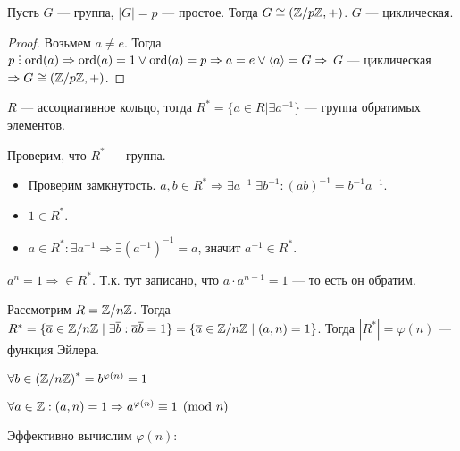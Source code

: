 \begin{remark}
    Пусть $G$ --- группа,  $|G| = p$ --- простое. Тогда  $G \cong (\mathbb{Z} / p\mathbb{Z}, +)$.  $G$ --- циклическая.
\end{remark}
\begin{proof}
    Возьмем $a \neq e$. Тогда  $p \divby \ord(a) \Rightarrow \ord(a) = 1 \lor \ord(a) = p \Rightarrow a = e \lor \langle a \rangle = G \Rightarrow$
    $G$ --- циклическая  $\Rightarrow G \cong (\mathbb{Z} / p \mathbb{Z}, +)$. 
\end{proof}
\begin{definition}
    $R$ --- ассоциативное кольцо, тогда  $R^* = \{a \in R | \exists a^{-1}\}$ --- группа обратимых элементов.
\end{definition}
Проверим, что $R^*$ --- группа. 
 \begin{itemize}
     \item Проверим замкнутость. $a, b \in R^* \Rightarrow \exists a^{-1}\; \exists b^{-1}: (ab)^{-1} = b^{-1} a^{-1}$.
     \item  $1 \in R^*$. 
     \item $a \in R^*: \exists a^{-1} \Rightarrow \exists \left(a^{-1}\right)^{-1} = a$, значит $a^{-1} \in R^*$. 
\end{itemize}
\begin{remark}
    $a^n = 1 \Rightarrow \in R^*$. Т.к. тут записано, что  $a \cdot a^{n-1} = 1$ --- то есть он обратим.
\end{remark}
\slashn
Рассмотрим $R = \mathbb{Z} / n\mathbb{Z}$. Тогда  $R^* = \{ \overline{a} \in \mathbb{Z} / n\mathbb{Z} \mid \exists \overline{b}: \overline{a} \overline{b} = 1\} = \{\overline{a} \in \mathbb{Z} / n\mathbb{Z} \mid (a, n) = 1\}$. Тогда $|R^*| = \varphi(n)$ --- функция Эйлера.
 \begin{theorem}
     $\forall b \in \left(\mathbb{Z} / n\mathbb{Z}\right)^* = b^{\varphi(n)} = 1$
\end{theorem}
\begin{theorem}
    $\forall a \in \mathbb{Z}: (a, n) = 1 \Rightarrow a^{\varphi(n)} \equiv 1 \pmod{n}$ 
\end{theorem}
\slashn
Эффективно вычислим $\varphi(n)$:
